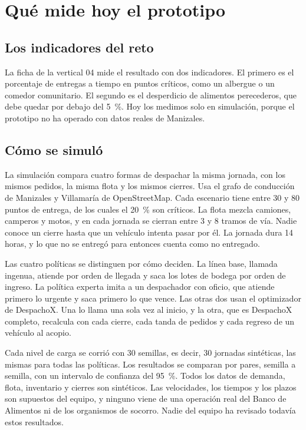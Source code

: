 \section{Qué mide hoy el prototipo}\label{sec:prototipo}

\subsection{Los indicadores del reto}

La ficha de la vertical 04 mide el resultado con dos indicadores. El primero es el porcentaje de entregas a tiempo en puntos críticos, como un albergue o un comedor comunitario. El segundo es el desperdicio de alimentos perecederos, que debe quedar por debajo del 5~\%. Hoy los medimos solo en simulación, porque el prototipo no ha operado con datos reales de Manizales.

\subsection{Cómo se simuló}

La simulación compara cuatro formas de despachar la misma jornada, con los mismos pedidos, la misma flota y los mismos cierres. Usa el grafo de conducción de Manizales y Villamaría de OpenStreetMap. Cada escenario tiene entre 30 y 80 puntos de entrega, de los cuales el 20~\% son críticos. La flota mezcla camiones, camperos y motos, y en cada jornada se cierran entre 3 y 8 tramos de vía. Nadie conoce un cierre hasta que un vehículo intenta pasar por él. La jornada dura 14 horas, y lo que no se entregó para entonces cuenta como no entregado.

Las cuatro políticas se distinguen por cómo deciden. La línea base, llamada ingenua, atiende por orden de llegada y saca los lotes de bodega por orden de ingreso. La política experta imita a un despachador con oficio, que atiende primero lo urgente y saca primero lo que vence. Las otras dos usan el optimizador de DespachoX. Una lo llama una sola vez al inicio, y la otra, que es DespachoX completo, recalcula con cada cierre, cada tanda de pedidos y cada regreso de un vehículo al acopio.

Cada nivel de carga se corrió con 30 semillas, es decir, 30 jornadas sintéticas, las mismas para todas las políticas. Los resultados se comparan por pares, semilla a semilla, con un intervalo de confianza del 95~\%. Todos los datos de demanda, flota, inventario y cierres son sintéticos. Las velocidades, los tiempos y los plazos son supuestos del equipo, y ninguno viene de una operación real del Banco de Alimentos ni de los organismos de socorro. Nadie del equipo ha revisado todavía estos resultados.

